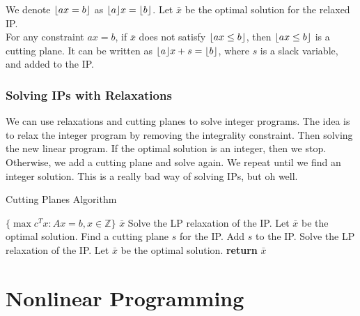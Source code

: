 \documentclass[a4paper]{report}
\DeclarePairedDelimiter{\floor}{\lfloor}{\rfloor}
\begin{document}
	\begin{definition}
		We denote $\floor{ax = b}$ as $\floor{a}x = \floor{b}$. Let $\bar x$ be the
		optimal solution for the relaxed IP. \\ For any constraint $ax = b$, if
		$\bar x$ does not satisfy $\floor{ax \leq b}$, then $\floor{ax \leq b}$ is a
		cutting plane. It can be written as $\floor{a}x + s = \floor{b}$, where $s$ is
		a slack variable, and added to the IP.
	\end{definition}

	\subsection{Solving IPs with Relaxations}
	We can use relaxations and cutting planes to solve integer programs. The idea
	is to relax the integer program by removing the integrality constraint. Then solving
	the new linear program. If the optimal solution is an integer, then we stop.
	Otherwise, we add a cutting plane and solve again. We repeat until we find an
	integer solution. This is a really bad way of solving IPs, but oh well.

	\begin{algorithm}
		 \algrenewcommand{}
		\algrenewcommand{}
		\caption{Cutting Planes Algorithm}
		\label{alg:cut}
		\begin{algorithmic}
			[1] \Require $\{\max c^{T}x : Ax = b, x \in \mathbb{Z}\}$ \Ensure $\bar x$
			\State Solve the LP relaxation of the IP. Let $\bar x$ be the optimal
			solution.  \State Find a cutting plane $s$
			for the IP. \State Add $s$ to the IP. \State Solve the LP relaxation of
			the IP. Let $\bar x$ be the optimal solution. \EndWhile \State \textbf{return}
			$\bar x$
		\end{algorithmic}
	\end{algorithm}

	\chapter{Nonlinear Programming}
\end{document}
